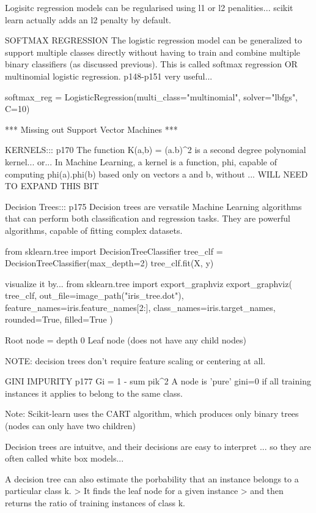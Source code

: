 Logisitc regression models can be regularised using l1 or l2 penalities...
scikit learn actually adds an l2 penalty by default.

SOFTMAX REGRESSION
The logistic regression model can be generalized to support multiple classes directly
without having to train and combine multiple binary classifiers (as discussed previous).
This is called softmax regression OR multinomial logistic regression.
p148-p151 very useful...

softmax_reg = LogisticRegression(multi_class="multinomial", solver="lbfgs", C=10)

*** Missing out Support Vector Machines ***

KERNELS:::
p170
The function K(a,b) = (a.b)^2
is a second degree polynomial kernel...
or...
In Machine Learning,
a kernel is a function, phi,
capable of computing phi(a).phi(b)
based only on vectors a and b,
without ...
WILL NEED TO EXPAND THIS BIT





Decision Trees::: p175
Decision trees are versatile Machine Learning algorithms
that can perform both classification and regression tasks.
They are powerful algorithms, capable of fitting complex datasets.

from sklearn.tree import DecisionTreeClassifier
tree_clf = DecisionTreeClassifier(max_depth=2)
tree_clf.fit(X, y)

visualize it by...
from sklearn.tree import export_graphviz
export_graphviz(
    tree_clf,
    out_file=image_path("iris_tree.dot"),
    feature_names=iris.feature_names[2:],
    class_names=iris.target_names,
    rounded=True,
    filled=True
)

Root node = depth 0
Leaf node (does not have any child nodes)

NOTE:
decision trees don't require feature scaling or centering at all.

GINI IMPURITY
p177
Gi = 1 - sum pik^2
A node is 'pure' gini=0
if all training instances it applies to belong to the same class.

Note:
Scikit-learn uses the CART algorithm,
which produces only binary trees (nodes can only have two children)

Decision trees are intuitve,
and their decisions are easy to interpret
... so they are often called white box models...

A decision tree can also estimate the porbability
that an instance belongs to a particular class k.
> It finds the leaf node for a given instance
> and then returns the ratio of training instances of class k.

